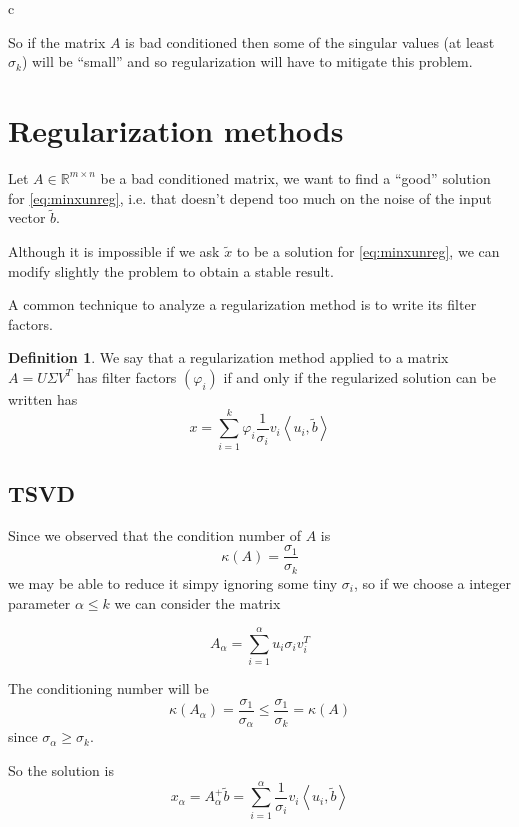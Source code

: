 c\documentclass[a4paper,10pt]{article}
\newcounter{counter1}
\theoremstyle{plain}
\theoremstyle{definition}
\newtheorem{mydef}[counter1]{Definition}
\theoremstyle{remark}
\newcommand{\pa}[1]{\left(#1\right)}
\newcommand{\ang}[1]{\left<#1\right>}
\begin{document}
So if the matrix $A$ is bad conditioned then some of the singular
values (at least $\sigma _k$) will be ``small'' and so regularization
will have to mitigate this problem.

\section{Regularization methods}
\label{sec:regularizationmethods}

Let $A\in \mathbb{R}^{m \times n}$ be a bad conditioned matrix, we
want to find a ``good'' solution for \ref{eq:minxunreg}, i.e. that
doesn't depend too much on the noise of the input vector $\tilde b$.

Although it is impossible if we ask $\tilde x$ to be a solution for
\ref{eq:minxunreg}, we can modify slightly the problem to obtain a
stable result.

A common technique to analyze a regularization method is to write its
filter factors.

\begin{mydef}
  We say that a regularization method applied to a matrix $A = U
  \Sigma V^T$ has filter factors $\pa{\varphi _i}$ if and only if the
  regularized solution can be written has
  \begin{equation}
    \label{eq:filterdef}
    x = \sum _{i=1} ^k \varphi _i \frac{1}{\sigma _i} v_i
    \ang{u_i,\tilde b}
  \end{equation}
\end{mydef}

\subsection{TSVD}
\label{sec:TSVD}

Since we observed that the condition number of $A$ is
\[ \kappa (A) = \frac{\sigma _1}{\sigma _k} \] we may be able to
reduce it simpy ignoring some tiny $\sigma _i$, so if we choose a
integer parameter $\alpha \le k$ we can consider the matrix

\begin{equation}
  \label{eq:TSVDmatrix}
  A_\alpha = \sum _{i=1} ^\alpha u_i \sigma _i v_i ^T
\end{equation}

The conditioning number will be
\[ \kappa (A_\alpha) = \frac{\sigma _1}{\sigma _\alpha} \le  \frac{\sigma
  _1}{\sigma _k} = \kappa(A) \]
since $\sigma _\alpha \ge \sigma _k$.

So the solution is
\begin{equation}
  \label{eq:TSVDsolution}
  x_\alpha = A_\alpha ^+ \tilde b = \sum _{i=1} ^\alpha \frac{1}{\sigma _i}
  v_i \ang{u_i,\tilde b}
\end{equation}
\end{document}
